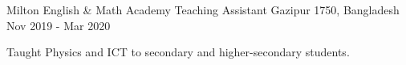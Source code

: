 
\begin{cventries}

  \cventry
    {Milton English \& Math Academy} %
    {Teaching Assistant} %
    {Gazipur 1750, Bangladesh} %
    {Nov 2019 - Mar 2020} %
    {
      \begin{cvitems} %
        \item {Taught Physics and ICT to secondary and higher-secondary students.}
      \end{cvitems}
    }

\end{cventries}

